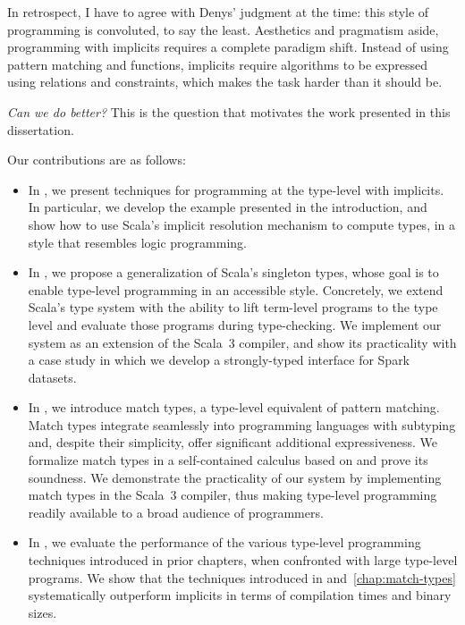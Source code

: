 In retrospect, I have to agree with Denys' judgment at the time: this style of programming is convoluted, to say the least.
Aesthetics and pragmatism aside, programming with implicits requires a complete paradigm shift.
Instead of using pattern matching and functions, implicits require algorithms to be expressed using relations and constraints, which makes the task harder than it should be.

\emph{Can we do better?} This is the question that motivates the work presented in this dissertation.

Our contributions are as follows:

\begin{itemize}
  \item In , we present techniques for programming at the type-level with implicits.
  In particular, we develop the example presented in the introduction, and show how to use Scala's implicit resolution mechanism to compute types, in a style that resembles logic programming.

  \item In , we propose a generalization of Scala's singleton types, whose goal is to enable type-level programming in an accessible style.
  Concretely, we extend Scala's type system with the ability to lift term-level programs to the type level and evaluate those programs during type-checking.
  We implement our system as an extension of the Scala~3 compiler, and show its practicality with a case study in which we develop a strongly-typed interface for Spark datasets.

  \item In , we introduce match types, a type-level equivalent of pattern matching.
  Match types integrate seamlessly into programming languages with subtyping and, despite their simplicity, offer significant additional expressiveness.
  We formalize match types in a self-contained calculus based on \SystemFsub and prove its soundness.
  We demonstrate the practicality of our system by implementing match types in the Scala~3 compiler, thus making type-level programming readily available to a broad audience of programmers.

  \item In , we evaluate the performance of the various type-level programming techniques introduced in prior chapters, when confronted with large type-level programs.
  We show that the techniques introduced in  and~\ref{chap:match-types} systematically outperform implicits in terms of compilation times and binary sizes.
\end{itemize}

